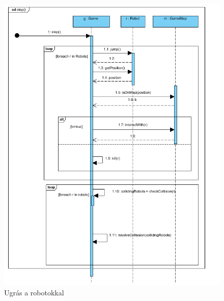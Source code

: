 \begin{figure}[!htbp]
	\begin{center}
		\includegraphics[width=\textwidth, center]{./chapters/chapter03/step.png}
		\caption{Ugrás a robotokkal}
	\end{center}
\end{figure}

